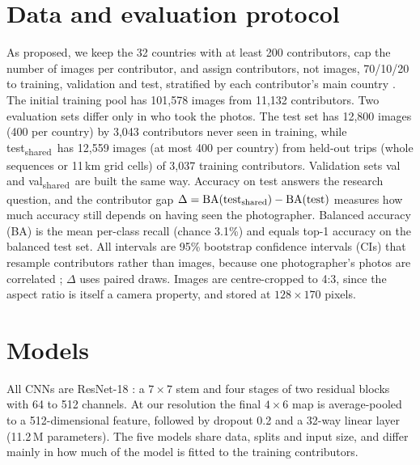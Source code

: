 \documentclass[9pt]{extarticle}
\newcommand{\tsh}{test\textsubscript{shared}}
\newcommand{\vsh}{val\textsubscript{shared}}
\begin{document}
\section{Data and evaluation protocol}
\label{sec:protocol}
As proposed, we keep the 32 countries with at least 200 contributors, cap the number of
images per contributor, and assign contributors, not images, 70/10/20 to training,
validation and test, stratified by each contributor's main country
\citep{roberts2017crossvalidation,kaufman2012leakage}. The initial training pool has
101{,}578 images from 11{,}132 contributors. Two evaluation sets differ only in who took the
photos. The test set has 12{,}800 images (400 per country) by 3{,}043 contributors never seen
in training, while \tsh\ has 12{,}559 images (at most 400 per country) from held-out trips
(whole sequences or 11\,km grid cells) of 3{,}037 training contributors. Validation sets val
and \vsh\ are built the same way. Accuracy on test answers the research
question, and the contributor gap
$\Delta=\mathrm{BA}(\text{\tsh})-\mathrm{BA}(\text{test})$ measures how much accuracy still depends on having seen the photographer. Balanced accuracy
(BA) is the mean per-class recall (chance 3.1\%) and equals top-1 accuracy on the balanced
test set. All intervals are 95\% bootstrap confidence intervals (CIs) that resample
contributors rather than images, because one photographer's photos are correlated
\citep{field2007bootstrap}; $\Delta$ uses paired draws. Images are centre-cropped to 4:3,
since the aspect ratio is itself a camera property, and stored at $128\times170$ pixels.

\section{Models}
\label{sec:models}
All CNNs are ResNet-18 \citep{he2016resnet}: a $7\times7$ stem and four stages of two
residual blocks with 64 to 512 channels. At our resolution the final $4\times6$ map is
average-pooled to a 512-dimensional feature, followed by dropout 0.2 and a 32-way linear
layer (11.2\,M parameters). The five models share data, splits and input size, and differ
mainly in how much of the model is fitted to the training contributors.
\end{document}

